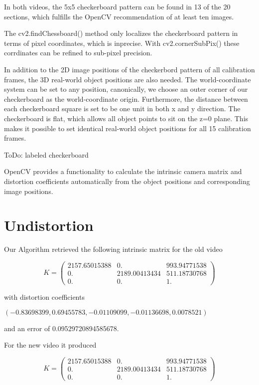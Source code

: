 \documentclass[bibliography=totoc]{scrartcl}
\begin{document}
In both videos, the 5x5 checkerboard pattern can be found in 13 of the 20 sections, which fulfills the OpenCV recommendation of at least ten images.

The cv2.findChessboard() method only localizes the checkerboard pattern in terms of pixel coordinates, which is inprecise.
With cv2.cornerSubPix() these corrdinates can be refined to sub-pixel precision.

In addition to the 2D image positions of the checkerbord pattern of all calibration frames, the 3D real-world object positions are also needed.
The world-coordinate system can be set to any position, canonically, we choose an outer corner of our checkerboard as the world-coordinate origin.
Furthermore, the distance between each checkerboard square is set to be one unit in both x and y direction. 
The checkerboard is flat, which allows all object points to sit on the z=0 plane.
This makes it possible to set identical real-world object positions for all 15 calibration frames.

ToDo: labeled checkerboard

OpenCV provides a functionality to calculate the intrinsic camera matrix and distortion coefficients automatically from the object positions and corresponding image positions.


\section{Undistortion}
Our Algorithm retrieved the following intrinsic matrix for the old video

$$
K =
\begin{pmatrix}
    2157.65015388 & 0. & 993.94771538 \\
    0. & 2189.00413434 & 511.18730768 \\
    0. & 0. & 1.
\end{pmatrix}
$$

with distortion coefficients

$(-0.83698399, 0.69455783, -0.01109099, -0.01136698, 0.0078521)$

and an error of 0.09529720894585678.

For the new video it produced 

$$
K =
\begin{pmatrix}
    2157.65015388 & 0. & 993.94771538 \\
    0. & 2189.00413434 & 511.18730768 \\
    0. & 0. & 1.
\end{pmatrix}
$$
\end{document}
